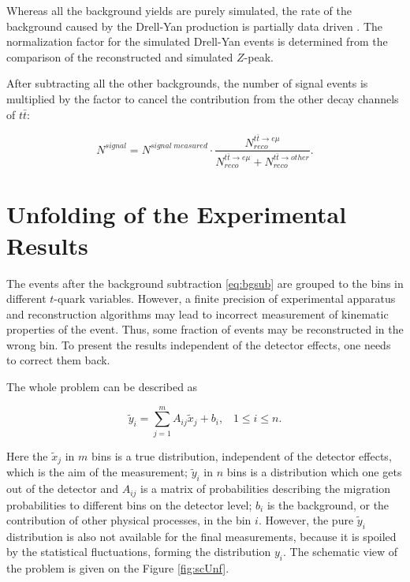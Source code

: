 Whereas all the background yields are purely simulated, the rate of the background caused by the Drell-Yan production is 
partially data driven \cite{Chatrchyan:2011nb}. The normalization factor for the simulated Drell-Yan events is determined 
from the comparison of the reconstructed and simulated $Z$-peak. 

After subtracting all the other backgrounds, the number of signal events is multiplied by the factor to cancel the contribution
from the other decay channels of $t\bar{t}$:

\begin{equation}\label{eq:bgsub}
 N^{signal} = N^{signal\;measured} \cdot \frac{N^{t\bar{t} \rightarrow e\mu}_{reco}}{N^{t\bar{t} \rightarrow e\mu}_{reco} + N^{t\bar{t} \rightarrow other}_{reco}}.
\end{equation}

\section{Unfolding of the Experimental Results}\label{sec:unfold}

The events after the background  subtraction \ref{eq:bgsub} are grouped to the bins in different $t$-quark variables. However, a finite precision
of experimental apparatus and reconstruction algorithms may lead to incorrect measurement of kinematic properties of the event.
Thus, some fraction of events may be reconstructed in the wrong bin. To present the results independent of the detector effects,
one needs to correct them back.

The whole problem can be described as

\begin{equation}\label{eq:UnfoldProb}
 \tilde{y}_i = \sum_{j = 1}^{m} A_{ij}\tilde{x}_{j} + b_{i}, \;\;\; 1 \leq i \leq n.
\end{equation}

Here the $\tilde{x}_j$ in $m$ bins is a true distribution, independent of the detector effects, which is the aim of the measurement;
$\tilde{y}_i$ in $n$ bins is a distribution which one gets out of the detector and $A_{ij}$ is a matrix of probabilities describing 
the migration probabilities to different bins on the detector level; $b_{i}$ is the background, or the contribution of other physical
processes, in the bin $i$. However, the pure $\tilde{y}_{i}$ distribution is also not available for the final measurements, because it is
spoiled by the statistical fluctuations, forming the distribution $y_{i}$. The schematic view of the problem is given on the Figure \ref{fig:scUnf}.

